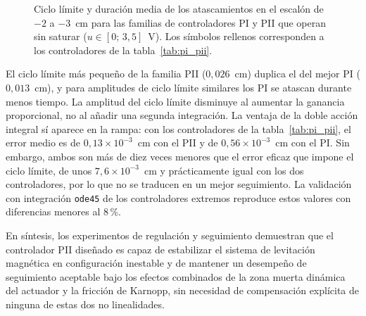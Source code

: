 \begin{figure}[ht]
    \centering
    
    \caption[Familias PI y PII]{Ciclo límite y duración media de los atascamientos en el escalón de $-2$ a $-3$~cm para las familias de controladores PI y PII que operan sin saturar ($u\in[0;\,3{,}5]$~V). Los símbolos rellenos corresponden a los controladores de la tabla~\ref{tab:pi_pii}.}
    \label{fig:r15_familias}
\end{figure}

El ciclo límite más pequeño de la familia PII ($0{,}026$~cm) duplica el del mejor PI ($0{,}013$~cm), y para amplitudes de ciclo límite similares los PI se atascan durante menos tiempo. La amplitud del ciclo límite disminuye al aumentar la ganancia proporcional, no al añadir una segunda integración. La ventaja de la doble acción integral sí aparece en la rampa: con los controladores de la tabla~\ref{tab:pi_pii}, el error medio es de $0{,}13\times10^{-3}$~cm con el PII y de $0{,}56\times10^{-3}$~cm con el PI. Sin embargo, ambos son más de diez veces menores que el error eficaz que impone el ciclo límite, de unos $7{,}6\times10^{-3}$~cm y prácticamente igual con los dos controladores, por lo que no se traducen en un mejor seguimiento. La validación con integración \texttt{ode45} de los controladores extremos reproduce estos valores con diferencias menores al 8\,\%.

En síntesis, los experimentos de regulación y seguimiento demuestran que el controlador PII
diseñado es capaz de estabilizar el sistema de levitación magnética en configuración inestable
y de mantener un desempeño de seguimiento aceptable bajo los efectos combinados de la
zona muerta dinámica del actuador y la fricción de Karnopp, sin necesidad de compensación
explícita de ninguna de estas dos no linealidades.
